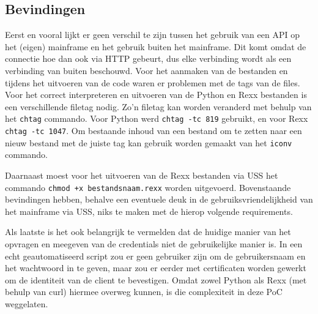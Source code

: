 \subsection{Bevindingen}
Eerst en vooral lijkt er geen verschil te zijn tussen het gebruik van een API op het (eigen) mainframe en het gebruik buiten het mainframe. Dit komt omdat de connectie hoe dan ook via HTTP gebeurt, dus elke verbinding wordt als een verbinding van buiten beschouwd. Voor het aanmaken van de bestanden en tijdens het uitvoeren van de code waren er problemen met de tags van de files. Voor het correct interpreteren en uitvoeren van de Python en Rexx bestanden is een verschillende filetag nodig. Zo'n filetag kan worden veranderd met behulp van het \texttt{chtag} commando. Voor Python werd \texttt{chtag -tc 819} gebruikt, en voor Rexx \texttt{chtag -tc 1047}. Om bestaande inhoud van een bestand om te zetten naar een nieuw bestand met de juiste tag kan gebruik worden gemaakt van het \texttt{iconv} commando. 

Daarnaast moest voor het uitvoeren van de Rexx bestanden via USS het commando \texttt{chmod +x bestandsnaam.rexx} worden uitgevoerd. Bovenstaande bevindingen hebben, behalve een eventuele deuk in de gebruiksvriendelijkheid van het mainframe via USS, niks te maken met de hierop volgende requirements.

Als laatste is het ook belangrijk te vermelden dat de huidige manier van het opvragen en meegeven van de credentials niet de gebruikelijke manier is. In een echt geautomatiseerd script zou er geen gebruiker zijn om de gebruikersnaam en het wachtwoord in te geven, maar zou er eerder met certificaten worden gewerkt om de identiteit van de client te bevestigen. Omdat zowel Python als Rexx (met behulp van curl) hiermee overweg kunnen, is die complexiteit in deze PoC weggelaten.

